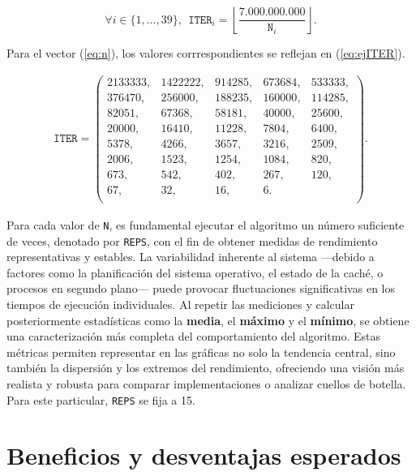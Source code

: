 \documentclass[11pt,a4paper,twoside]{article}
\theoremstyle{definition}
\begin{document}
	\begin{equation} \label{eq:ITER}
		\forall i \in \lbrace 1, \dots, 39 \rbrace, \:\: \texttt{ITER}_i = \left\lfloor \dfrac{7.000.000.000}{\texttt{N}_i} \right\rfloor.
	\end{equation}

	Para el vector (\ref{eq:n}), los valores corrrespondientes se reflejan en (\ref{eq:ejITER}).
	
	\begin{equation} \label{eq:ejITER}
		\begin{aligned}
			\texttt{ITER} = \left(
			\begin{matrix}
				2133333, & 1422222, & 914285, & 673684, & 533333, \\
				376470, & 256000, & 188235, & 160000, & 114285, \\
				82051, & 67368, & 58181, & 40000, & 25600, \\
				20000, & 16410, & 11228, & 7804, & 6400, \\
				5378, & 4266, & 3657, & 3216, & 2509, \\
				2006, & 1523, & 1254, & 1084, & 820, \\
				673, & 542, & 402, & 267, & 120, \\
				67, & 32, & 16, & 6. &  \\
			\end{matrix}
			\right).
		\end{aligned}
	\end{equation}

	Para cada valor de \texttt{N}, es fundamental ejecutar el algoritmo un número suficiente de veces, denotado por \texttt{REPS}, con el fin de obtener medidas de rendimiento representativas y estables. La variabilidad inherente al sistema ---debido a factores como la planificación del sistema operativo, el estado de la caché, o procesos en segundo plano--- puede provocar fluctuaciones significativas en los tiempos de ejecución individuales. Al repetir las mediciones y calcular posteriormente estadísticas como la \textbf{media}, el \textbf{máximo} y el \textbf{mínimo}, se obtiene una caracterización más completa del comportamiento del algoritmo. Estas métricas permiten representar en las gráficas no solo la tendencia central, sino también la dispersión y los extremos del rendimiento, ofreciendo una visión más realista y robusta para comparar implementaciones o analizar cuellos de botella. Para este particular, \texttt{REPS} se fija a 15.
		
	
	\section{Beneficios y desventajas esperados}
	
\end{document}
